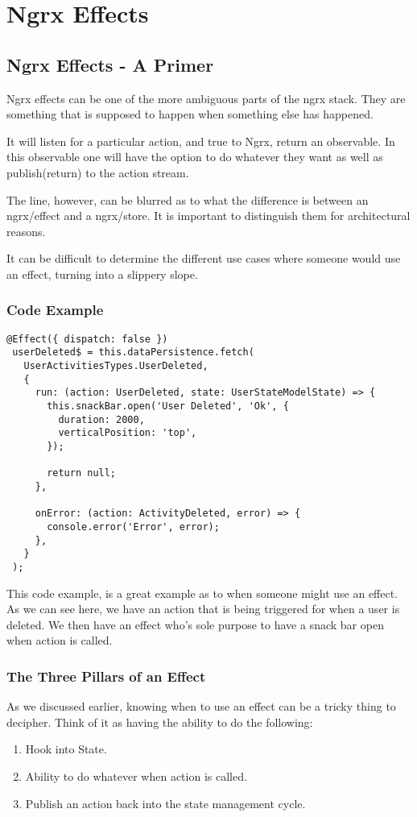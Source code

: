 \chapter{ Ngrx Effects }

\section{Ngrx Effects - A Primer}
Ngrx effects can be one of the more ambiguous parts of the ngrx stack. They are something that is supposed to happen when something else has happened. 

It will listen for a particular action, and true to Ngrx, return an observable. In this observable one will have the option to do whatever they want as well as publish(return) to the action stream.

The line, however, can be blurred as to what the difference is between an ngrx/effect and a ngrx/store. It is important to distinguish them for architectural reasons. 

It can be difficult to determine the different use cases where someone would use an effect, turning into a slippery slope.

\subsection{ Code Example }
\begin{lstlisting}
@Effect({ dispatch: false })
 userDeleted$ = this.dataPersistence.fetch(
   UserActivitiesTypes.UserDeleted,
   {
     run: (action: UserDeleted, state: UserStateModelState) => {
       this.snackBar.open('User Deleted', 'Ok', {
         duration: 2000,
         verticalPosition: 'top',
       });

       return null;
     },

     onError: (action: ActivityDeleted, error) => {
       console.error('Error', error);
     },
   }
 );
\end{lstlisting}

This code example, is a great example as to when someone might use an effect. As we can see here, we have an action that is being triggered for when a user is deleted. We then have an effect who's sole purpose to have a snack bar open when action is called.

\subsection{ The Three Pillars of an Effect }
As we discussed earlier, knowing when to use an effect can be a tricky thing to decipher. Think of it as having the ability to do the following:
\begin{enumerate}
  \item Hook into State.
  \item Ability to do whatever when action is called.
  \item Publish an action back into the state management cycle.
\end{enumerate}

